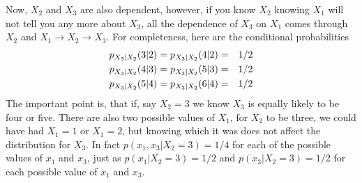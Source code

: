 \documentclass[12pt]{article}
\begin{document}
Now, $X_2$ and $X_3$ are also dependent, however, if you know $X_2$
knowing $X_1$ will not tell you any more about $X_3$, all the
dependence of $X_3$ on $X_1$ comes through $X_2$ and $X_1\rightarrow
X_2 \rightarrow X_3$. For completeness, here are the conditional probabilities
\begin{eqnarray}
p_{X_3|X_2}(3|2)=p_{X_3|X_2}(4|2)&=&1/2\cr
p_{X_3|X_2}(4|3)=p_{X_3|X_2}(5|3)&=&1/2\cr
p_{X_3|X_2}(5|4)=p_{X_3|X_2}(6|4)&=&1/2
\end{eqnarray}
The important point is, that if, say $X_2=3$ we know $X_3$ is equally
likely to be four or five. There are also two possible values of
$X_1$, for $X_2$ to be three, we could have had $X_1=1$ or $X_1=2$,
but knowing which it was does not affect the distribution for
$X_3$. In fact $p(x_1,x_3|X_2=3)=1/4$ for each of the possible values of
$x_1$ and $x_3$, just as $p(x_1|X_2=3)=1/2$ and $p(x_3|X_2=3)=1/2$ for each
possible value of $x_1$ and $x_3$.
\end{document}
